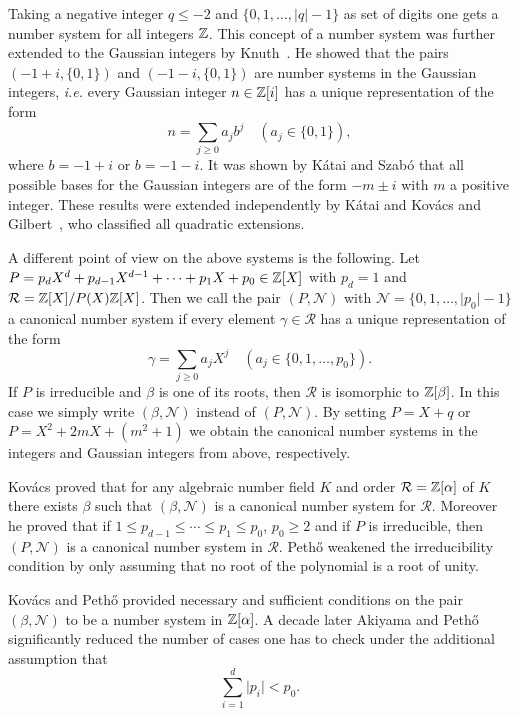 Taking a negative integer $q\leq-2$ and $\{0,1,\ldots,\lvert
q\rvert-1\}$ as set of digits one gets a number system for all
integers ${\mathbb Z}$.  This concept of a number system was further extended
to the Gaussian integers by
Knuth~\cite{knuth1981:art_computer_programming}. He showed that the
pairs $(-1+i,\{0,1\})$ and $(-1-i,\{0,1\})$ are number systems in the
Gaussian integers, \textit{i.e.} every Gaussian integer $n\in{\mathbb Z}[i]$
has a unique representation of the form
$$n=\sum_{j\geq0}a_jb^j\quad(a_j\in\{0,1\}),$$
where $b=-1+i$ or $b=-1-i$. It was shown by K{\'a}tai and Szab{\'o}
\cite{katai_szabo1975:canonical_number_systems} that all possible
bases for the Gaussian integers are of the form $-m\pm i$ with $m$ a positive
integer. These results were extended independently by K\'atai and
Kov\'acs \cite{katai_kovacs1981:canonical_number_systems,
  katai_kovacs1980:kanonische_zahlensysteme_in} and
Gilbert~\cite{gilbert81:_radix}, who classified all quadratic
extensions.

A different point of view on the above systems is the following. Let
$P=p_dX^d+p_{d-1}X^{d-1}+\cdots+p_1X+p_0\in{\mathbb Z}[X]$ with $p_d=1$ and
$\mathcal{R}={\mathbb Z}[X]/P(X){\mathbb Z}[X]$. Then we call the pair $(P,\mathcal{N})$
with $\mathcal{N}=\{0,1,\ldots,\lvert p_0\rvert-1\}$ a canonical
number system if every element $\gamma\in\mathcal{R}$ has a unique
representation of the form
$$\gamma=\sum_{j\geq0}a_jX^j\quad(a_j\in\{0,1,\ldots,p_0\}).$$
If $P$ is irreducible and $\beta$ is one of its roots, then
$\mathcal{R}$ is isomorphic to ${\mathbb Z}[\beta]$. In this case we simply
write $(\beta,\mathcal{N})$ instead of $(P,\mathcal{N})$. By setting
$P=X+q$ or $P=X^2+2mX+(m^2+1)$ we obtain the canonical number systems
in the integers and Gaussian integers from above, respectively.

Kov\'acs \cite{kovacs1981:canonical_number_systems} proved that for
any algebraic number field $K$ and order $\mathcal R={\mathbb Z}[\alpha]$ of
$K$ there exists $\beta$ such that $(\beta,\mathcal{N})$ is a
canonical number system for $\mathcal R$. Moreover he proved that if
$1\leq p_{d-1}\leq \cdots\leq p_1\leq p_0$, $p_0\geq2$ and if $P$ is
irreducible, then $(P,\mathcal{N})$ is a canonical number system in
$\mathcal{R}$. Peth{\H o}
\cite{pethoe1991:polynomial_transformation_and} weakened the
irreducibility condition by only assuming that no root of the
polynomial is a root of unity.

Kov\'acs and Peth{\H o} \cite{kovacs_petho1991:number_systems_in}
provided necessary and sufficient conditions on the pair
$(\beta,\mathcal{N})$ to be a number system in ${\mathbb Z}[\alpha]$. A decade
later Akiyama 
and Peth{\H o} \cite{akiyama_petho2002:canonical_number_systems}
significantly reduced the number of cases one has to check under the
additional assumption that
$$\sum_{i=1}^d\lvert p_i\rvert<p_0.$$

